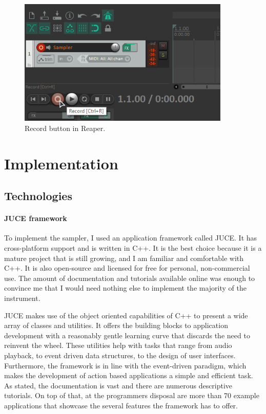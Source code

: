\documentclass[12pt, a4paper, hidelinks]{article}
\begin{document}
	
	\begin{figure}[h!]
		\centering
		\includegraphics[width=0.9\textwidth]{u/rec.png}
		\caption{Record button in Reaper.}
		\label{fig:rec}
	\end{figure}
	
	\newpage
	\section{Implementation}
	\subsection{Technologies}	
	\paragraph{JUCE framework\\}
	To implement the sampler, I used an application framework called JUCE\cite{juceweb}. It has cross-platform support and is written in C++. It is the best choice because  it is a mature project that is still growing, and I am familiar and comfortable with C++. It is also open-source and licensed for free for personal, non-commercial use. The amount of documentation and tutorials available online was enough to convince me that I would need nothing else to implement the majority of the instrument.
	
	JUCE makes use of the object oriented capabilities of C++ to present a wide array of classes and utilities. It offers the building blocks to application development with a reasonably gentle learning curve that discards the need to reinvent the wheel. These utilities help with tasks that range from audio playback, to event driven data structures, to the design of user interfaces. Furthermore, the framework is in line with the event-driven paradigm, which makes the development of action based applications a simple and efficient task. As stated, the documentation is vast and there are numerous descriptive tutorials. On top of that, at the programmers disposal are more than 70 example applications that showcase the several features the framework has to offer. 
	
\end{document}
